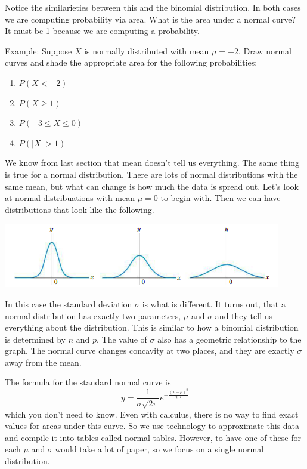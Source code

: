 \documentclass[14,fleqn]{article}
\begin{document}
Notice the similarieties between this and the binomial distribution. In both cases we are computing probability via area. What is the area under a normal curve?\\
It must be 1 because we are computing a probability.

Example: Suppose $X$ is normally distributed with mean $\mu=-2.$ Draw normal curves and shade the appropriate area for the following probabilities:
\begin{enumerate}
	\item $P(X<-2)$
	\item $P(X\ge 1)$
	\item $P(-3\le X\le 0)$
	\item $P(|X|>1)$
\end{enumerate}

We know from last section that mean doesn't tell us everything. The same thing is true for a normal distribution. There are lots of normal distributions with the same mean, but what can change is how much the data is spread out. Let's look at normal distribuations with mean $\mu=0$ to begin with. Then we can have distributions that look like the following.\\
\begin{center}
	\includegraphics{differentvariance.png}
\end{center}
In this case the standard deviation $\sigma$ is what is different. It turns out, that a normal distribution has exactly two parameters, $\mu$ and $\sigma$ and they tell us everything about the distribution. This is similar to how a binomial distribution is determined by $n$ and $p.$ The value of $\sigma$ also has a geometric relationship to the graph. The normal curve changes concavity at two places, and they are exactly $\sigma$ away from the mean.

The formula for the standard normal curve is 
\[
	y=\frac{1}{\sigma\sqrt{2\pi}}e^{-\frac{(x-\mu)^2}{2\sigma^2}}
\]
which you don't need to know. Even with calculus, there is no way to find exact values for areas under this curve. So we use technology to approximate this data and compile it into tables called normal tables. However, to have one of these for each $\mu$ and $\sigma$ would take a lot of paper, so we focus on a single normal distribution.
\end{document}
